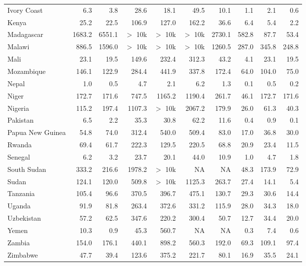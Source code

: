 \begin{table}[b]
{\begin{tabular}[t]{lrrrrrrrrr}
Ivory Coast & 6.3 & 3.8 & 28.6 & 18.1 & 49.5 & 10.1 & 1.1 & 2.1 & 0.6\\
Kenya & 25.2 & 22.5 & 106.9 & 127.0 & 162.2 & 36.6 & 6.4 & 5.4 & 2.2\\
Madagascar & 1683.2 & 6551.1 & $>$ 10k & $>$ 10k & $>$ 10k & 2730.1 & 582.8 & 87.7 & 53.4\\
Malawi & 886.5 & 1596.0 & $>$ 10k & $>$ 10k & $>$ 10k & 1260.5 & 287.0 & 345.8 & 248.8\\
Mali & 23.1 & 19.5 & 149.6 & 232.4 & 312.3 & 43.2 & 4.1 & 23.1 & 19.5\\
Mozambique & 146.1 & 122.9 & 284.4 & 441.9 & 337.8 & 172.4 & 64.0 & 104.0 & 75.0\\
Nepal & 1.0 & 0.5 & 4.7 & 2.1 & 6.2 & 1.3 & 0.1 & 0.5 & 0.2\\
Niger & 172.7 & 171.6 & 747.5 & 1165.2 & 1190.4 & 261.7 & 46.1 & 172.7 & 171.6\\
Nigeria & 115.2 & 197.4 & 1107.3 & $>$ 10k & 2067.2 & 179.9 & 26.0 & 61.3 & 40.3\\
Pakistan & 6.5 & 2.2 & 35.3 & 30.8 & 62.2 & 11.6 & 0.4 & 0.9 & 0.1\\
Papua New Guinea & 54.8 & 74.0 & 312.4 & 540.0 & 509.4 & 83.0 & 17.0 & 36.8 & 30.0\\
Rwanda & 69.4 & 61.7 & 222.3 & 129.5 & 220.5 & 68.8 & 20.9 & 23.4 & 11.5\\
Senegal & 6.2 & 3.2 & 23.7 & 20.1 & 44.0 & 10.9 & 1.0 & 4.7 & 1.8\\
South Sudan & 333.2 & 216.6 & 1978.2 & $>$ 10k & NA & NA & 48.3 & 173.9 & 72.9\\
Sudan & 124.1 & 120.0 & 509.8 & $>$ 10k & 1125.3 & 263.7 & 27.4 & 14.1 & 5.4\\
Tanzania & 105.4 & 96.6 & 370.5 & 396.7 & 475.1 & 130.7 & 29.3 & 30.6 & 14.4\\
Uganda & 91.9 & 81.8 & 263.4 & 372.6 & 331.2 & 115.9 & 28.0 & 34.3 & 18.0\\
Uzbekistan & 57.2 & 62.5 & 347.6 & 220.2 & 300.4 & 50.7 & 12.7 & 34.4 & 20.0\\
Yemen & 10.3 & 0.9 & 45.3 & 560.7 & NA & NA & 0.3 & 7.4 & 0.6\\
Zambia & 154.0 & 176.1 & 440.1 & 898.2 & 560.3 & 192.0 & 69.3 & 109.1 & 97.4\\
Zimbabwe & 47.7 & 39.4 & 123.6 & 375.2 & 221.7 & 80.1 & 16.9 & 35.5 & 24.1\\
\bottomrule
\end{tabular}}
\end{table}